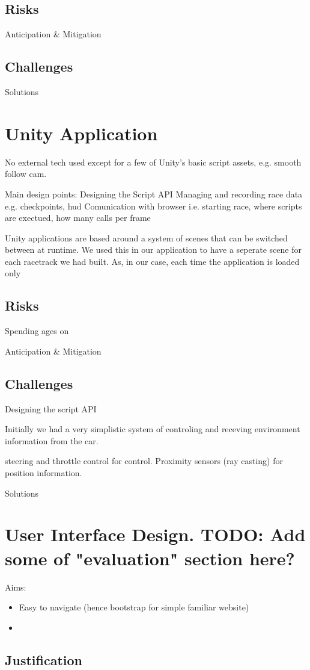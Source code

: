 \subsection{Risks}
Anticipation \& Mitigation

\subsection{Challenges}
Solutions

\section{Unity Application}
No external tech used except for a few of Unity's basic script assets, e.g. smooth follow cam.

Main design points:
Designing the Script API
Managing and recording race data e.g. checkpoints, hud
Comunication with browser i.e. starting race, where scripts are exectued, how many calls per frame

Unity applications are based around a system of scenes that can be switched between at runtime. We used this in our application to have a seperate scene for each racetrack we had built. As, in our case, each time the application is loaded only 

\subsection{Risks}
Spending ages on 

Anticipation \& Mitigation

\subsection{Challenges}
Designing the script API

Initially we had a very simplistic system of controling and receving environment information from the car. 

steering and throttle control for control. Proximity sensors (ray casting) for position information. 

Solutions

\section{User Interface Design. TODO: Add some of "evaluation" section here?}
Aims:
\begin{itemize}
\item Easy to navigate (hence bootstrap for simple familiar website) 
\item 
\end{itemize}



\subsection{Justification}



